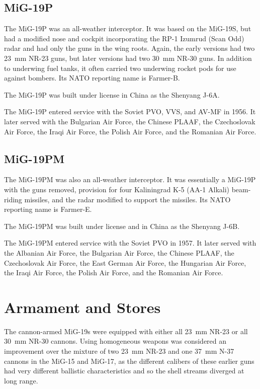 \subsection{MiG-19P}

The MiG-19P was an all-weather interceptor. It was based on the MiG-19S, but had a modified nose and cockpit incorporating the RP-1 Izumrud (Scan Odd) radar and had only the guns in the wing roots. Again, the early versions had two 23~mm NR-23 guns, but later versions had two 30~mm NR-30 guns. In addition to underwing fuel tanks, it often carried two underwing rocket pods for use against bombers. Its NATO reporting name is Farmer-B.

The MiG-19P was built under license in China as the Shenyang J-6A.

The MiG-19P entered service with the Soviet PVO, VVS, and AV-MF in 1956. It later served with the Bulgarian Air Force, the Chinese PLAAF, the Czechoslovak Air Force, the Iraqi Air Force, the Polish Air Force, and the Romanian Air Force.

\subsection{MiG-19PM}

The MiG-19PM was also an all-weather interceptor. It was essentially a MiG-19P with the guns removed, provision for four Kaliningrad K-5 (AA-1 Alkali) beam-riding missiles, and the radar modified to support the missiles. Its NATO reporting name is Farmer-E.

The MiG-19PM was built under license and in China as the Shenyang J-6B.

The MiG-19PM entered service with the Soviet PVO in 1957. It later served with the Albanian Air Force, the Bulgarian Air Force, the Chinese PLAAF, the Czechoslovak Air Force, the East German Air Force, the Hungarian Air Force, the Iraqi Air Force, the Polish Air Force, and the Romanian Air Force.

\section{Armament and Stores}

The cannon-armed MiG-19s were equipped with either all 23~mm NR-23 or all 30~mm NR-30 cannons. Using homogeneous weapons was considered an improvement over the mixture of two 23~mm NR-23 and one 37~mm N-37 cannons in the MiG-15 and MiG-17, as the different calibers of these earlier guns had very different ballistic characteristics and so the shell streams diverged at long range.

